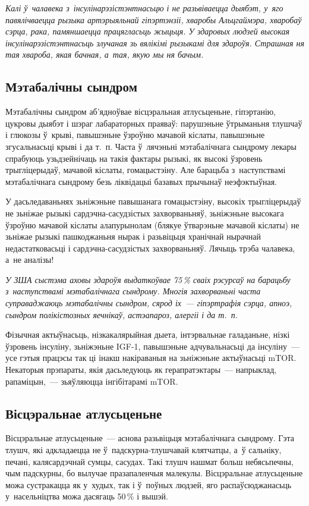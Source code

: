 \emph{Калі ў~чалавека з~інсулінарэзістэнтнасьцю і не разьвіваецца дыябэт, у~яго павялічваецца рызыка артэрыяльнай гіпэртэнзіі, хваробы Альцгаймэра, хваробаў сэрца, рака, памяншаецца працягласьць жыцьця. У здаровых людзей высокая інсулінарэзістэнтнасьць злучаная зь вялікімі рызыкамі для здароўя. Страшная ня тая хвароба, якая бачная, а~тая, якую мы ня бачым.}

\subsection*{Мэтабалічны сындром}

Мэтабалічны сындром аб'ядноўвае вісцэральная атлусьценьне, гіпэртанію, цукровы дыябэт і шэраг лабараторных праяваў: парушэньне ўтрыманьня тлушчаў і глюкозы ў~крыві, павышэньне ўзроўню мачавой кіслаты, павышэньне згусальнасьці крыві і да т.~п. Часта ў~лячэньні мэтабалічнага сындрому лекары спрабуюць узьдзейнічаць на такія фактары рызыкі, як высокі ўзровень трыгліцерыдаў, мачавой кіслаты, гомацыстэіну. Але барацьба з~наступствамі мэтабалічнага сындрому безь ліквідацыі базавых прычынаў неэфэктыўная.

У дасьледаваньнях зьніжэньне павышанага гомацыстэіну, высокіх трыгліцерыдаў не зьніжае рызыкі сардэчна-сасудзістых захворваньняў, зьніжэньне высокага ўзроўню мачавой кіслаты алапурынолам (блякуе ўтварэньне мачавой кіслаты) не зьніжае рызыкі пашкоджаньня нырак і разьвіцьця хранічнай нырачнай недастатковасьці і сардэчна-сасудзістых захворваньняў. Лячыць трэба чалавека, а~не аналізы!

\emph{У ЗША сыстэма аховы здароўя выдаткоўвае 75\,\% сваіх рэсурсаў на барацьбу з~наступствамі мэтабалічнага сындрому. Многія захворваньні часта суправаджаюць мэтабалічны сындром, сярод іх~--- гіпэртрафія сэрца, апноэ, сындром полікістозных яечнікаў, астэапароз, алергіі і да т.~п.}

Фізычная актыўнасьць, нізкакалярыйная дыета, інтэрвальнае галаданьне, нізкі ўзровень інсуліну, зьніжэньне IGF-1, павышэньне адчувальнасьці да інсуліну~--- усе гэтыя працэсы так ці інакш накіраваныя на зьніжэньне актыўнасьці mTOR. Некаторыя прэпараты, якія дасьледуюць як герапратэктары~--- напрыклад, рапаміцын,~--- зьяўляюцца інгібітарамі mTOR.

\subsection*{Вісцэральнае атлусьценьне}

Вісцэральнае атлусьценьне~--- аснова разьвіцьця мэтабалічнага сындрому. Гэта тлушч, які адкладаецца не ў~падскурна-тлушчавай клятчатцы, а~ў сальніку, печані, калясардэчнай сумцы, сасудах. Такі тлушч нашмат больш небясьпечны, чым падскурны, бо вылучае празапаленчыя малекулы. Вісцэральнае атлусьценьне можа сустракацца як у~худых, так і ў~поўных людзей, яго распаўсюджанасьць у~насельніцтва можа дасягаць 50\,\% і вышэй.

